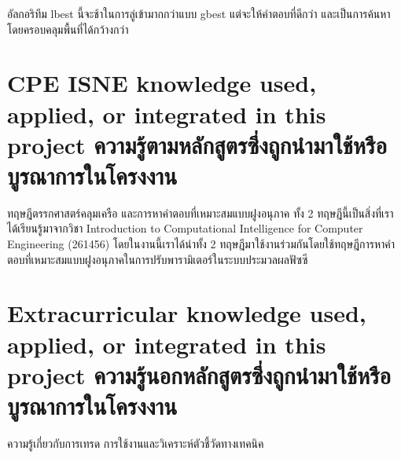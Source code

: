 อัลกอริทึม lbest นี้จะช้าในการลู่เข้ามากกว่าแบบ gbest แต่จะให้คำตอบที่ดีกว่า และเป็นการค้นหาโดยครอบคลุมพื้นที่ได้กว้างกว่า

\section{\ifenglish%
\ifcpe CPE \else ISNE \fi knowledge used, applied, or integrated in this project
\else%
ความรู้ตามหลักสูตรซึ่งถูกนำมาใช้หรือบูรณาการในโครงงาน
\fi
}

ทฤษฎีตรรกศาสตร์คลุมเครือ และการหาคำตอบที่เหมาะสมแบบฝูงอนุภาค ทั้ง 2 ทฤษฎีนี้เป็นสิ่งที่เราได้เรียนรู้มาจากวิชา Introduction to Computational Intelligence for Computer Engineering (261456) โดยในงานนี้เราได้นำทั้ง 2 ทฤษฎีมาใช้งานร่วมกันโดยใช้ทฤษฎีการหาคำตอบที่เหมาะสมแบบฝูงอนุภาคในการปรับพารามิเตอร์ในระบบประมวลผลฟัซซี

\section{\ifenglish%
Extracurricular knowledge used, applied, or integrated in this project
\else%
ความรู้นอกหลักสูตรซึ่งถูกนำมาใช้หรือบูรณาการในโครงงาน
\fi
}

ความรู้เกี่ยวกับการเทรด การใช้งานและวิเคราะห์ตัวชี้วัดทางเทคนิค
